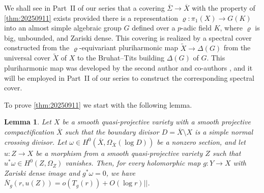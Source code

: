\documentclass[11pt,english]{smfart}
\theoremstyle{plain}
\newtheorem{lem}[thm]{Lemma}
\theoremstyle{definition}
\theoremstyle{remark}
\numberwithin{equation}{section}
\theoremstyle{plain}
\begin{document}
We shall see in Part~II of our series that a covering $\overline{\Sigma}\to \overline{X}$ with the property of \cref{thm:20250911} exists provided there is a representation $\varrho:\pi_1(X)\to G(K)$ into an almost simple algebraic group $G$ defined over a $p$-adic field $K$, where $\varrho$ is big, unbounded, and Zariski dense.
This covering is realized by a spectral cover constructed from the $\varrho$-equivariant pluriharmonic map $\widetilde{X}\to\Delta(G)$ from the universal cover $\widetilde{X}$ of $X$ to the Bruhat–Tits building $\Delta(G)$ of $G$.
This pluriharmonic map was developed by the second author and co-authors \cite{BDDM}, and it will be employed in  Part~II of our series to construct the corresponding spectral cover.



To prove \cref{thm:20250911} we start with the following lemma.



\begin{lem}\label{lem:20250911}
Let $X$ be a smooth quasi-projective variety with a smooth projective compactification $\overline{X}$ such that the boundary divisor $D=\overline{X}\setminus X$ is a simple normal crossing divisor.
Let $\omega \in H^0(\overline{X}, \Omega_{\overline{X}}(\log D))$ be a nonzero section, and let $u:Z \to X$ be a morphism from a smooth quasi-projective variety $Z$ such that $u^*\omega \in H^0(Z, \Omega_Z)$ vanishes.
Then, for every holomorphic map $g:Y \to X$ with Zariski dense image and $g^*\omega=0$, we have
$\overline{N}_g(r,  u(Z))= o(T_{g}(r))+O(\log r)||$.
\end{lem}
\end{document}
